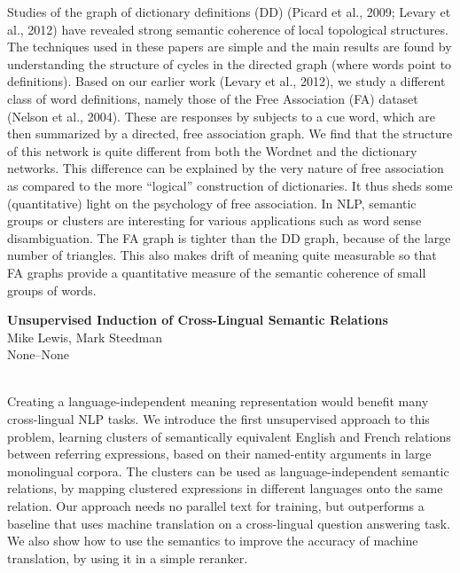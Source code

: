 \documentclass[twoside,makeidx]{book}
\begin{document}
{\small Studies of the graph of dictionary definitions (DD) (Picard et al., 2009; Levary et al., 2012) have revealed strong semantic coherence of local topological structures. The techniques used in these papers are simple and the main results are found by understanding the structure of cycles in the directed graph (where words point to definitions). Based on our earlier work (Levary et al., 2012), we study a different class of word definitions, namely those of the Free Association (FA) dataset (Nelson et al., 2004). These are responses by subjects to a cue word, which are then summarized by a directed, free association graph.   We find that the structure of this network is quite different from both the Wordnet and the dictionary networks. This difference can be explained by the very nature of free association as compared to the more ``logical'' construction of dictionaries. It thus sheds some (quantitative) light on the psychology of free association.  In NLP, semantic groups or clusters are interesting for various applications such as word sense disambiguation. The FA graph is tighter than the DD graph, because of the large number of triangles. This also makes drift of meaning quite measurable so that FA graphs provide a quantitative measure of the semantic coherence of small groups of words.}
\par\vspace{2em}\noindent%
\begin{minipage}{\linewidth}%
\begin{center}
\textbf{\normalsize Unsupervised Induction of Cross-Lingual Semantic Relations}\\
\normalsize  Mike Lewis,  Mark Steedman\\
{\small None--None}\\
\end{center}
\end{minipage}\\[0.5em]
\nopagebreak%
\noindent%
{\small Creating a language-independent meaning representation would benefit many cross-lingual NLP tasks. We introduce the first unsupervised approach to this problem, learning clusters of semantically equivalent English and French relations between referring expressions, based on their named-entity arguments in large monolingual corpora. The clusters can be used as language-independent semantic relations, by mapping clustered expressions in different languages onto the same relation. Our approach needs no parallel text for training, but outperforms a baseline that uses machine translation on a cross-lingual question answering task. We also show how to use the semantics to improve the accuracy of machine translation, by using it in a simple reranker.}
\end{document}
